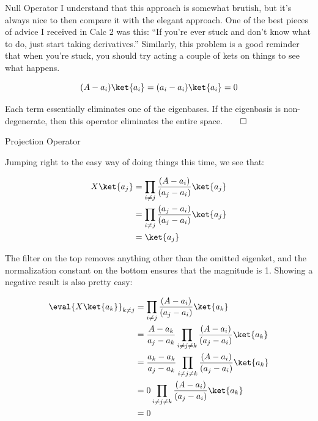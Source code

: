 \begin{answer}
\begin{answerpart}{Null Operator}
  I understand that this approach is somewhat brutish, but it's always
  nice to then compare it with the elegant approach.  One of the best
  pieces of advice I received in Calc 2 was this: ``If you're ever
  stuck and don't know what to do, just start taking derivatives.''
  Similarly, this problem is a good reminder that when you're stuck,
  you should try acting a couple of kets on things to see what happens.

  \begin{equation}
    (A - a_i)\ket{a_i} = (a_i - a_i)\ket{a_i} = 0
  \end{equation}

  Each term essentially eliminates one of the eigenbases.  If the
  eigenbasis is non-degenerate, then this operator eliminates the
  entire space.$\qed$
  
\end{answerpart}



\begin{answerpart}{Projection Operator}

  Jumping right to the easy way of doing things this time, we see that:
  
  \begin{equation}
    \begin{split}
      X\ket{a_j}
      &= \prod_{i \ne j}\frac{(A - a_i)}{(a_j - a_i)}\ket{a_j}\\
      &= \prod_{i \ne j}\frac{(a_j - a_i)}{(a_j - a_i)}\ket{a_j}\\
      &= \ket{a_j}\\
    \end{split}
  \end{equation}

  The filter on the top removes anything other than the omitted
  eigenket, and the normalization constant on the bottom ensures that
  the magnitude is 1.  Showing a negative result is also pretty easy:

  \begin{equation}
    \begin{split}
      \eval{X\ket{a_k}}_{k \ne j}
      &= \prod_{i \ne j}\frac{(A - a_i)}{(a_j - a_i)}\ket{a_k}\\
      &= \frac{A - a_k}{a_j - a_k}\prod_{i \ne j \ne k}\frac{(A - a_i)}{(a_j - a_i)}\ket{a_k}\\
      &= \frac{a_k - a_k}{a_j - a_k}\prod_{i \ne j \ne k}\frac{(A - a_i)}{(a_j - a_i)}\ket{a_k}\\
      &= 0\prod_{i \ne j \ne k}\frac{(A - a_i)}{(a_j - a_i)}\ket{a_k}\\
      &= 0\\
    \end{split}
  \end{equation}


\end{answerpart}
\end{answer}
